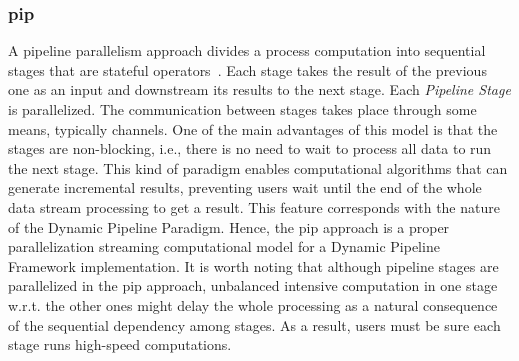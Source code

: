 \subsubsection{\acrfull{pip}} \label{prelim-pip}
A pipeline parallelism approach divides a process computation into sequential stages that are stateful operators~\cite{hr19}. Each stage takes the result of the previous one as an input and downstream its results to the next stage. Each \emph{Pipeline Stage} is parallelized. The communication between stages takes place through some means, typically channels. One of the main advantages of this model is that the stages are non-blocking, i.e., there is no need to wait to process all data to run the next stage. This kind of paradigm enables computational algorithms that can generate incremental results, preventing users wait until the end of the whole data stream processing to get a result. This feature corresponds with the nature of the Dynamic Pipeline Paradigm. Hence, the \acrshort{pip} approach is a proper parallelization streaming computational model for a Dynamic Pipeline Framework implementation. It is worth noting that although pipeline stages are parallelized in the \acrshort{pip} approach,  unbalanced intensive computation in one stage w.r.t. the other ones might delay the whole processing as a natural consequence of the sequential dependency among stages. As a result, users must be sure each stage runs high-speed computations. 
